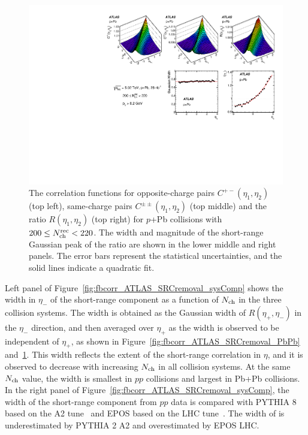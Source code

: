 \begin{figure}[H]
\centering
\includegraphics[width=.95\linewidth]{figs/chapter_fbcorr/ATLAS_SRCremoval_pPb.pdf}
\caption{The correlation functions for opposite-charge pairs $C^{+-}(\eta_1, \eta_2)$ (top left), same-charge pairs $C^{\pm\pm}(\eta_1, \eta_2)$ (top middle) and the ratio $R(\eta_1, \eta_2)$ (top right) for $p$+Pb collisions with $200 \le N_\text{ch}^\text{rec} < 220$. The width and magnitude of the short-range Gaussian peak of the ratio are shown in the lower middle and right panels. The error bars represent the statistical uncertainties, and the solid lines indicate a quadratic fit.}
\label{fig:fbcorr_ATLAS_SRCremoval_pPb}
\end{figure}

Left panel of Figure~\ref{fig:fbcorr_ATLAS_SRCremoval_sysComp} shows the width in $\eta_-$ of the short-range component as a function of $N_\text{ch}$ in the three collision systems. The width is obtained as the Gaussian width of $R(\eta_+, \eta_-)$ in the $\eta_-$ direction, and then averaged over $\eta_+$ as the width is observed to be independent of $\eta_+$, as shown in Figure~\ref{fig:fbcorr_ATLAS_SRCremoval_PbPb} and~\ref{fig:fbcorr_ATLAS_SRCremoval_pPb}. This width reflects the extent of the short-range correlation in $\eta$, and it is observed to decrease with increasing $N_\text{ch}$ in all collision systems. At the same $N_\text{ch}$ value, the width is smallest in $pp$ collisions and largest in Pb+Pb collisions. In the right panel of Figure~\ref{fig:fbcorr_ATLAS_SRCremoval_sysComp}, the width of the short-range component from $pp$ data is compared with PYTHIA 8 based on the A2 tune~\cite{ATL-PHYS-PUB-2011-014} and EPOS based on the LHC tune~\cite{Pierog:2013ria}. The width of is underestimated by PYTHIA 2 A2 and overestimated by EPOS LHC.

